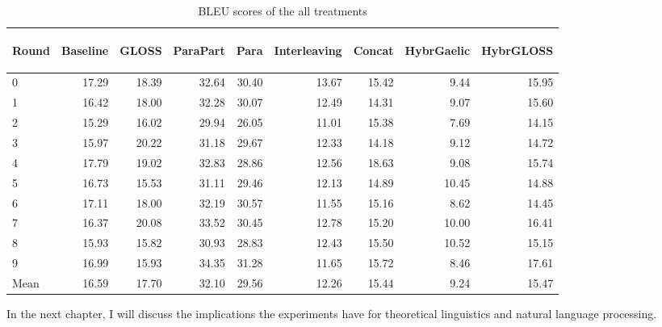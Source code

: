 \documentclass[final]{ua-thesis}
\numberwithin{equation}{section}
\begin{document}
\begin{table}[ht]
\centering
\begin{tabular}{lrrrrrrrr}
  \hline
\begin{sideways} Round \end{sideways} & \begin{sideways} Baseline \end{sideways} & \begin{sideways} GLOSS \end{sideways} & \begin{sideways} ParaPart \end{sideways} & \begin{sideways} Para \end{sideways} & \begin{sideways} Interleaving \end{sideways} & \begin{sideways} Concat \end{sideways} & \begin{sideways} HybrGaelic \end{sideways} & \begin{sideways} HybrGLOSS \end{sideways} \\ 
  \hline
0 & 17.29 & 18.39 & 32.64 & 30.40 & 13.67 & 15.42 & 9.44 & 15.95 \\ 
  1 & 16.42 & 18.00 & 32.28 & 30.07 & 12.49 & 14.31 & 9.07 & 15.60 \\ 
  2 & 15.29 & 16.02 & 29.94 & 26.05 & 11.01 & 15.38 & 7.69 & 14.15 \\ 
  3 & 15.97 & 20.22 & 31.18 & 29.67 & 12.33 & 14.18 & 9.12 & 14.72 \\ 
  4 & 17.79 & 19.02 & 32.83 & 28.86 & 12.56 & 18.63 & 9.08 & 15.74 \\ 
  5 & 16.73 & 15.53 & 31.11 & 29.46 & 12.13 & 14.89 & 10.45 & 14.88 \\ 
  6 & 17.11 & 18.00 & 32.19 & 30.57 & 11.55 & 15.16 & 8.62 & 14.45 \\ 
  7 & 16.37 & 20.08 & 33.52 & 30.45 & 12.78 & 15.20 & 10.00 & 16.41 \\ 
  8 & 15.93 & 15.82 & 30.93 & 28.83 & 12.43 & 15.50 & 10.52 & 15.15 \\ 
  9 & 16.99 & 15.93 & 34.35 & 31.28 & 11.65 & 15.72 & 8.46 & 17.61 \\ 
   \hline
Mean & 16.59 & 17.70 & 32.10 & 29.56 & 12.26 & 15.44 & 9.24 & 15.47 \\ 
   \hline
\end{tabular}
\caption{BLEU scores of the all treatments} 
\label{table:complete_table}
\end{table}
In the next chapter, I will discuss the implications the experiments have for theoretical linguistics and natural language processing. 
\end{document}
